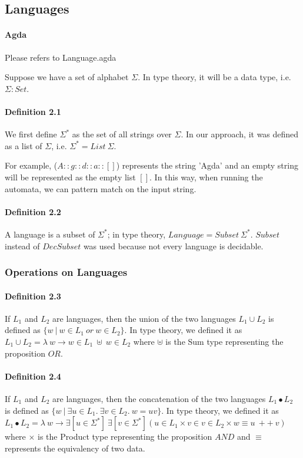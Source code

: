 \documentclass[twoside,openright,final]{bhamthesis}
\begin{document}
\subsection{Languages}
\paragraph{Agda} Please refers to Language.agda \\

\par Suppose we have a set of alphabet \(\Sigma\). In type theory, it will be a data type,
i.e. \(\Sigma : Set\). 

\paragraph{Definition 2.1} We first define \(\Sigma^*\) as the set of all
strings over \(\Sigma\). In our approach, it was defined as a list of
\(\Sigma\), i.e. \(\Sigma^* = List\ \Sigma\). 

\par For example, (\(A :: g ::
d :: a :: []\)) represents the string 'Agda' and an empty string will
be represented as the empty list \([]\). In this way, when running the
automata, we can pattern match on the input string. 

\paragraph{Definition 2.2} A language is a subset of
\(\Sigma^*\); in type theory, \(Language = Subset\ \Sigma^*\). 
\(Subset\) instead of \(DecSubset\) was used because not every language is decidable. 

\subsubsection{Operations on Languages}

\paragraph{Definition 2.3} If \(L_1\) and \(L_2\) are languages, then
the union of the two languages \(L_1\cup L_2\) is defined as \(\{w\  |\  w \in L_1\ or\ w \in
L_2\}\). In type theory, we defined it as \(L_1 \cup L_2 = \lambda\ w \to w \in L_1\ \uplus\ w
\in L_2\) where \(\uplus\) is the Sum type representing the
proposition \(OR\). 

\paragraph{Definition 2.4} If \(L_1\) and \(L_2\) are languages, then
the concatenation of the two languages 
\(L_1\bullet L_2\) is defined
as \(\{w\  |\  \exists u\in L_1.\ \exists v\in L_2.\ w = uv\}\). In
type theory, we defined it as \(L_1\bullet L_2 = \lambda\ w \to \exists[
u \in \Sigma^* ]\ \exists[ v \in \Sigma^* ] ( u \in L_1 \times v \in v \in
L_2 \times w \equiv u\ ++\ v ) \) where \(\times\) is the Product type
representing the proposition \(AND\) and \(\equiv\) represents the
equivalency of two data. 
\end{document}
